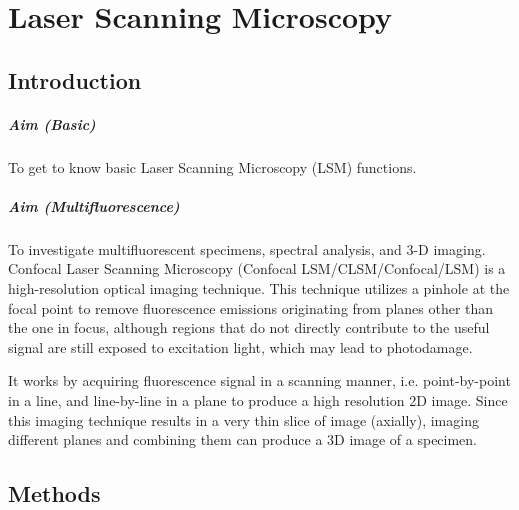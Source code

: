 
\chapter{Laser Scanning Microscopy}
\label{chp:LSM}

\section{Introduction}

\paragraph{Aim (Basic)}To get to know basic Laser Scanning Microscopy (LSM) functions.
\paragraph{Aim (Multifluorescence)}To investigate multifluorescent specimens, spectral analysis, and 3-D imaging.
\\

Confocal Laser Scanning Microscopy (Confocal LSM/CLSM/Confocal/LSM) is a high-resolution optical imaging technique. 
This technique utilizes a pinhole at the focal point to remove fluorescence emissions originating from planes other than the one in focus, although regions that do not directly contribute to the useful signal are still exposed to excitation light, which may lead to photodamage.

It works by acquiring fluorescence signal in a scanning manner, i.e. point-by-point in a line, and line-by-line in a plane to produce a high resolution 2D image. 
Since this imaging technique results in a very thin slice of image (axially), imaging different planes and combining them can produce a 3D image of a specimen.


\section{Methods}

